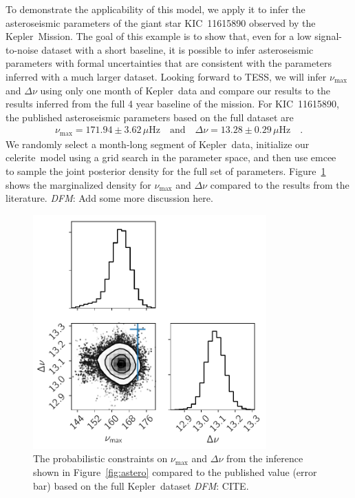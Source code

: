 \documentclass[manuscript, letterpaper]{aastex6}
\newcommand{\project}[1]{\textsf{#1}}
\newcommand{\kepler}{\project{Kepler}}
\newcommand{\tess}{\project{TESS}}
\newcommand{\celerite}{\project{celerite}}
\newcommand{\emcee}{\project{emcee}}
\newcommand{\figureref}[1]{\ref{fig:#1}}
\newcommand{\Figure}[1]{Figure~\figureref{#1}}
\newcommand{\figurelabel}[1]{\label{fig:#1}}
\newcommand{\todo}[3]{{\color{#2}\emph{#1}: #3}}
\newcommand{\dfmtodo}[1]{\todo{DFM}{red}{#1}}
\begin{document}
To demonstrate the applicability of this model, we apply it to infer the
asteroseismic parameters of the giant star KIC~11615890 observed by the
\kepler\ Mission.
The goal of this example is to show that, even for a low signal-to-noise
dataset with a short baseline, it is possible to infer asteroseismic
parameters with formal uncertainties that are consistent with the parameters
inferred with a much larger dataset.
Looking forward to \tess \citep{Campante2016}, we will infer $\nu_\mathrm{max}$ and $\Delta\nu$
using only one month of \kepler\ data and compare our results to the results
inferred from the full 4 year baseline of the mission.
For KIC~11615890, the published asteroseismic parameters based on the full
dataset are \citep{Pinsonneault:2014}
\begin{eqnarray}
    \nu_\mathrm{max} = 171.94 \pm 3.62 \,\mu\mathrm{Hz} \quad\mathrm{and}\quad
    \Delta\nu = 13.28 \pm 0.29 \,\mu\mathrm{Hz} \quad.
\end{eqnarray}
We randomly select a month-long segment of \kepler\ data, initialize our
\celerite\ model using a grid search in the parameter space, and then use
\emcee\ \citep{Foreman-Mackey:2013} to sample the joint posterior density for
the full set of parameters.
\Figure{astero-corner} shows the marginalized density for $\nu_\mathrm{max}$
and $\Delta\nu$ compared to the results from the literature.
\dfmtodo{Add some more discussion here.}

\begin{figure}[!htbp]
\begin{center}
\includegraphics[width=0.8\textwidth]{figures/astero-11615890-numax_deltanu_corner.pdf}
\caption{The probabilistic constraints on $\nu_\mathrm{max}$ and $\Delta \nu$
    from the inference shown in \Figure{astero} compared to the published
    value (error bar) based on the full \kepler\ dataset \dfmtodo{CITE}.
    \figurelabel{astero-corner}}
\end{center}
\end{figure}
\end{document}
